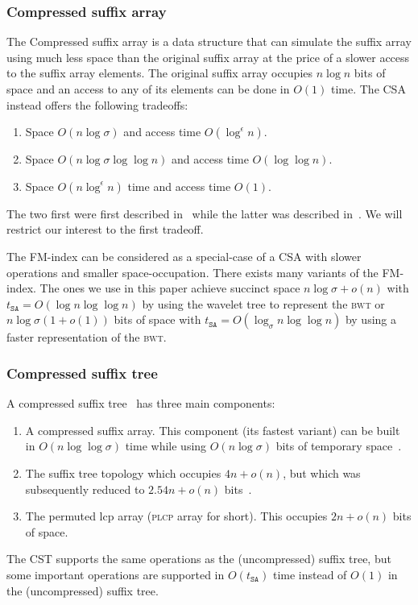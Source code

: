 \documentclass[a4paper]{article}
\begin{document}
\subsubsection{Compressed suffix array}
The Compressed suffix array is a data structure that can simulate the suffix array using much less space than the original suffix array at the price of a slower access to the suffix array elements. The original suffix array occupies $n\log n$ bits of space and an access to any of its elements can be done in $O(1)$ time. 
The \textsc{CSA} instead offers the following tradeoffs: 
\begin{enumerate}
\item Space $O(n\log\sigma)$ and access time $O(\log^\epsilon n)$. 
\item Space $O(n\log\sigma\log\log n)$ and access time $O(\log\log n)$. 
\item Space $O(n\log^\epsilon n)$ time and access time $O(1)$. 
\end{enumerate}
The two first were first described in~\cite{GV05} while the latter was described in~\cite{Rao02}. 
We will restrict our interest to the first tradeoff. 

The FM-index can be considered as a special-case of a \textsc{CSA} with slower operations 
and smaller space-occupation. There exists many variants of the FM-index. The ones we use in this paper
achieve succinct space $n\log\sigma+o(n)$ with $t_{\mathtt{SA}}=O(\log n\log\log n)$ by using the wavelet tree
to represent the \textsc{bwt} or $n\log\sigma(1+o(1))$ bits of space with $t_{\mathtt{SA}}=O(\log_\sigma n\log\log n)$
by using a faster representation of the \textsc{bwt}. 

\subsubsection{Compressed suffix tree}
A compressed suffix tree~\cite{Sa07a} has three main components: 
\begin{enumerate}
\item A compressed suffix array. This component (its fastest variant) can be built in $O(n\log\log\sigma)$ time while using $O(n\log\sigma)$ bits of temporary space~\cite{HSS09}. 
\item The suffix tree topology which occupies $4n+o(n)$, but which was subsequently reduced to $2.54n+o(n)$ bits~\cite{Fi11}. 
\item The permuted lcp array (\textsc{plcp} array for short). This occupies $2n+o(n)$ bits of space. 
\end{enumerate}
The \textsc{CST} supports the same operations as the (uncompressed) suffix tree, but some important operations are supported in $O(t_{\mathtt{SA}})$ time instead of $O(1)$ in the (uncompressed) suffix tree.  
\end{document}
